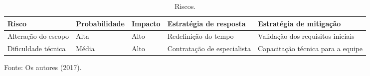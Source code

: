 \begin{table}[!htb]
    \begin{center}
        \caption{Riscos.} \label{tab:riscos}
        \begin{tabular}{ p{1.7cm} | p{2cm} | p{1.1cm} | p{2cm} | p{2cm} }
            \hline
            \textbf{Risco} &\textbf{Probabilidade} &\textbf{Impacto} & \textbf{Estratégia de resposta} & \textbf{Estratégia de mitigação} \\
            \hline
            Alteração do
            escopo
             &  Alta  &  Alto  &  Redefinição
             do tempo
               & Validação dos requisitos iniciais  \\
            \hline
            Dificuldade técnica &  Média  &  Alto  &  Contratação de especialista  &  Capacitação técnica para a equipe  \\
            \hline
        \end{tabular}
    \end{center}
    Fonte: Os autores (2017).
\end{table}
 

